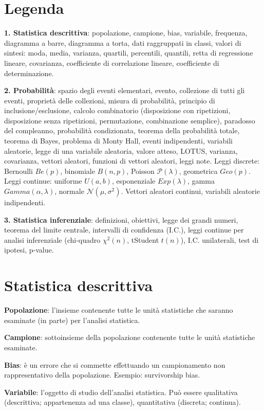 \documentclass[11pt,a4paper]{article}
\newcommand{\pagina}[1]{\clearpage}
\begin{document}
\section*{Legenda}
\textbf{1. Statistica descrittiva}: popolazione, campione, bias, variabile, frequenza, diagramma a barre, diagramma a torta, dati raggruppati in classi, valori di sintesi: moda, media, varianza, quartili, percentili, quantili, retta di regressione lineare, covarianza, coefficiente di correlazione lineare, coefficiente di determinazione.

\textbf{2. Probabilità}: spazio degli eventi elementari, evento, collezione di tutti gli eventi, proprietà delle collezioni, misura di probabilità, principio di inclusione/esclusione, calcolo combinatorio (disposizione con ripetizioni, disposizione senza ripetizioni, permutazione, combinazione semplice), paradosso del compleanno, probabilità condizionata, teorema della probabilità totale, teorema di Bayes, problema di Monty Hall, eventi indipendenti, variabili aleatorie, legge di una variabile aleatoria, valore atteso, LOTUS, varianza, covarianza, vettori aleatori, funzioni di vettori aleatori, leggi note. Leggi discrete: Bernoulli $Be(p)$, binomiale $B(n,p)$, Poisson $\mathcal P(\lambda)$, geometrica $Geo(p)$. Leggi continue: uniforme $U(a,b)$, esponenziale $Exp(\lambda)$, gamma $Gamma(\alpha,\lambda)$, normale $\mathcal N(\mu,\sigma^2)$. Vettori aleatori continui, variabili aleatorie indipendenti.

\textbf{3. Statistica inferenziale}: definizioni, obiettivi, legge dei grandi numeri, teorema del limite centrale, intervalli di confidenza (I.C.), leggi continue per analisi inferenziale (chi-quadro $\chi^2(n)$, tStudent $t(n)$), I.C. unilaterali, test di ipotesi, p-value.
\pagina{2}\section*{Statistica descrittiva}
\textbf{Popolazione}: l'insieme contenente tutte le unità statistiche che saranno esaminate (in parte) per l'analisi statistica.

\textbf{Campione}: sottoinsieme della popolazione contenente tutte le unità statistiche esaminate.

\textbf{Bias}: è un errore che si commette effettuando un campionamento non rappresentativo della popolazione. Esempio: survivorship bias.

\textbf{Variabile}: l'oggetto di studio dell'analisi statistica. Può essere qualitativa (descrittiva; appartenenza ad una classe), quantitativa (discreta; continua).
\end{document}
